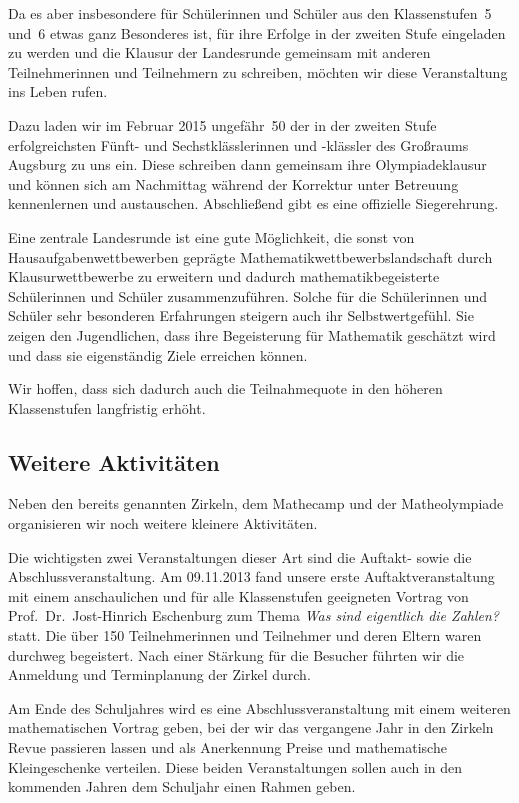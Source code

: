 \documentclass[12pt]{zettel}
\begin{document}
Da es aber insbesondere für Schülerinnen und Schüler aus den Klassenstufen~5
und~6 etwas ganz Besonderes ist, für ihre Erfolge in der zweiten Stufe
eingeladen zu werden und die Klausur der Landesrunde gemeinsam mit anderen
Teilnehmerinnen und Teilnehmern zu schreiben, möchten wir diese Veranstaltung
ins Leben rufen.

Dazu laden wir im Februar 2015 ungefähr~50 der in der zweiten Stufe
erfolgreichsten Fünft- und Sechstklässlerinnen und -klässler des Großraums
Augsburg zu uns ein. Diese schreiben dann gemeinsam ihre Olympiadeklausur und
können sich am Nachmittag während der Korrektur unter Betreuung kennenlernen
und austauschen. Abschließend gibt es eine offizielle Siegerehrung.

Eine zentrale Landesrunde ist eine gute Möglichkeit, die sonst von
Hausaufgabenwettbewerben geprägte Mathematikwettbewerbslandschaft durch
Klausurwettbewerbe zu erweitern und dadurch mathematikbegeisterte Schülerinnen
und Schüler zusammenzuführen. Solche für die Schülerinnen und Schüler
sehr besonderen Erfahrungen steigern auch ihr Selbstwertgefühl. Sie zeigen
den Jugendlichen, dass ihre Begeisterung für Mathematik geschätzt wird und dass sie eigenständig Ziele erreichen können.

Wir hoffen, dass sich dadurch auch die Teilnahmequote
in den höheren Klassenstufen langfristig erhöht.


\subsection{Weitere Aktivitäten}

Neben den bereits genannten Zirkeln, dem Mathecamp und der
Matheolympiade organisieren wir noch weitere kleinere
Aktivitäten.

Die wichtigsten zwei Veranstaltungen dieser Art sind die Auftakt- sowie die
Abschlussveranstaltung. Am 09.11.2013 fand unsere erste
Auftaktveranstaltung mit einem anschaulichen und für alle Klassenstufen
geeigneten Vortrag von
Prof.~Dr.~Jost-Hinrich Eschenburg zum Thema \emph{Was sind eigentlich die
Zahlen?} statt.
Die über 150 Teilnehmerinnen und Teilnehmer und deren Eltern waren durchweg
begeistert. Nach einer Stärkung für die Besucher führten wir
die Anmeldung und Terminplanung der Zirkel durch.

Am Ende des Schuljahres wird es eine Abschlussveranstaltung mit einem
weiteren mathematischen Vortrag geben, bei der wir
das vergangene Jahr in den Zirkeln Revue passieren lassen und als Anerkennung
Preise und mathematische Kleingeschenke verteilen. Diese beiden Veranstaltungen sollen
auch in den kommenden Jahren dem Schuljahr einen Rahmen geben.
\end{document}
